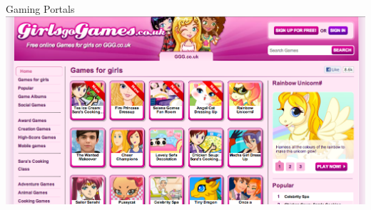 \documentclass[aspectratio=43]{beamer}
\begin{document}
\begin{frame}{Gaming Portals}
    \includegraphics[width=\textwidth]{images/ggg.png}
\end{frame}
\end{document}
